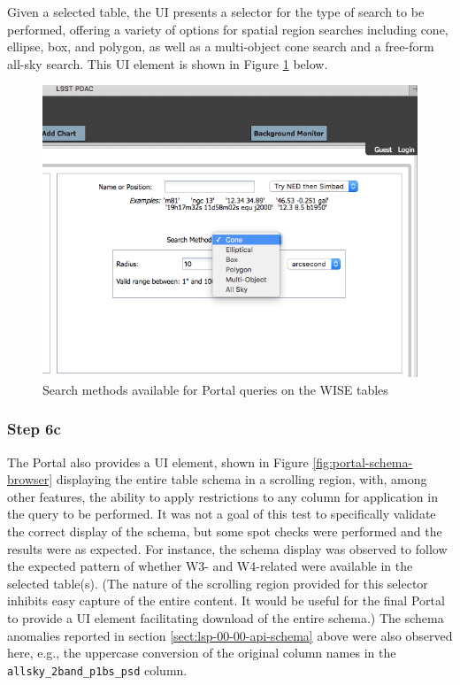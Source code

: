 \documentclass[DM,lsstdraft,STR,toc]{lsstdoc}
\begin{document}
Given a selected table, the UI presents a selector for the type of search to be performed, offering a variety of options for spatial region searches including cone, ellipse, box, and polygon, as well as a multi-object cone search and a free-form all-sky search.
This UI element is shown in Figure \ref{fig:portal-search-methods} below.

\begin{figure}
  \includegraphics[width=\linewidth]{lsp-00-00/search-methods-pane.png}
  \caption{Search methods available for Portal queries on the WISE tables}
  \label{fig:portal-search-methods}
\end{figure}

\subsubsection{Step 6c}

The Portal also provides a UI element, shown in Figure \ref{fig:portal-schema-browser} displaying the entire table schema in a scrolling region, with, among other features, the ability to apply restrictions to any column for application in the query to be performed.
It was not a goal of this test to specifically validate the correct display of the schema, but some spot checks were performed and the results were as expected.
For instance, the schema display was observed to follow the expected pattern of whether W3- and W4-related were available in the selected table(s).
(The nature of the scrolling region provided for this selector inhibits easy capture of the entire content.
It would be useful for the final Portal to provide a UI element facilitating download of the entire schema.)
The schema anomalies reported in section \ref{sect:lsp-00-00-api-schema} above were also observed here, e.g., the uppercase conversion of the original column names in the \verb|allsky_2band_p1bs_psd| column.
\end{document}
